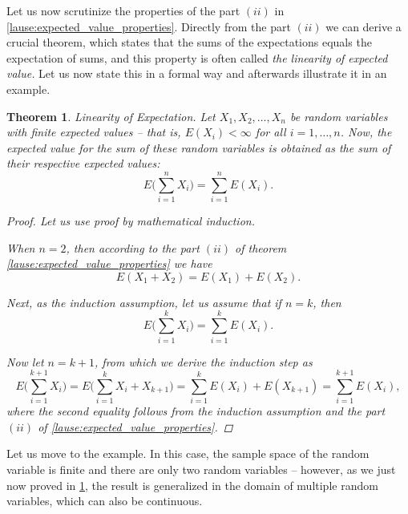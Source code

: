 \documentclass[12pt,a4paper,leqno]{report}
\theoremstyle{plain}
\newtheorem{lause}[equation]{Theorem}
\theoremstyle{definition}
\begin{document}
Let us now scrutinize the properties of the part $(ii)$ in \ref{lause:expected_value_properties}. Directly from the part $(ii)$ we can derive a crucial theorem, which states that the sums of the expectations equals the expectation of sums, and this property is often called \emph{the linearity of expected value.} Let us now state this in a formal way and afterwards illustrate it in an example.

\begin{lause}\label{lause:expected_value_linearity}
Linearity of Expectation. Let $X_1,X_2,\ldots,X_n$ be random variables with finite expected values -- that is, $E(X_i) < \infty$ for all $i = 1, \ldots, n$. Now, the expected value for the sum of these random variables is obtained as the sum of their respective expected values:
\[
E\big(\sum_{i=1}^n X_i \big) = \sum_{i=1}^nE(X_i).
\]
\begin{proof}
Let us use proof by mathematical induction.

When $n = 2$, then according to the part $(ii)$ of theorem \ref{lause:expected_value_properties} we have
\[
E(X_1+X_2) = E(X_1) + E(X_2).
\]

Next, as the induction assumption, let us assume that if $n = k$, then 
\[
E\big(\sum_{i=1}^k X_i \big) = \sum_{i=1}^k E(X_i).
\]

Now let $n = k+1$, from which we derive the induction step as
\[
E\big(\sum_{i=1}^{k+1} X_i \big) = E\big(\sum_{i=1}^{k} X_i + X_{k+1} \big) = \sum_{i=1}^{k} E(X_i) + E(X_{k+1}) = \sum_{i=1}^{k+1} E(X_i),
\]
where the second equality follows from the induction assumption and the part $(ii)$ of \ref{lause:expected_value_properties}.
\end{proof}
\end{lause}

Let us move to the example. In this case, the sample space of the random variable is finite and there are only two random variables -- however, as we just now proved in \ref{lause:expected_value_linearity}, the result is generalized in the domain of multiple random variables, which can also be continuous.
\end{document}

